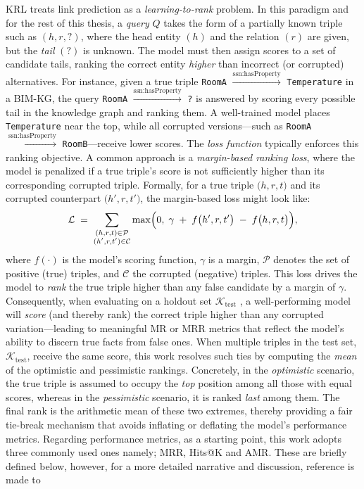 \ac{KRL} treats link prediction as a \emph{learning-to-rank} problem. In this paradigm and for the rest of this thesis, a \emph{query} \( Q \) takes the form of a partially known triple such as \((h, r, ?)\), where the head entity \((h)\) and the relation \((r)\) are given, but the \emph{tail} \((?)\) is unknown. The model must then assign scores to a set of candidate tails, ranking the correct entity \emph{higher} than incorrect (or corrupted) alternatives. For instance, given a true triple \texttt{RoomA} $\xrightarrow{\text{ssn:hasProperty}}$ \texttt{Temperature} in a \ac{BIM-KG}, the query \texttt{RoomA} $\xrightarrow{\text{ssn:hasProperty}}$ \texttt{?} is answered by scoring every possible tail in the knowledge graph and ranking them. A well-trained model places \texttt{Temperature} near the top, while all corrupted versions---such as \texttt{RoomA} $\xrightarrow{\text{ssn:hasProperty}}$ \texttt{RoomB}---receive lower scores. The \emph{loss function} typically enforces this ranking objective. A common approach is a \emph{margin-based ranking loss}, where the model is penalized if a true triple's score is not sufficiently higher than its corresponding corrupted triple. Formally, for a true triple \(\bigl(h, r, t\bigr)\) and its corrupted counterpart \(\bigl(h', r, t'\bigr)\), the margin-based loss might look like:
\[
\mathcal{L} \;=\; \sum_{\substack{(h,r,t) \in \mathcal{P} \\ (h',r,t') \in \mathcal{C}}} \max\Bigl(0,\;\gamma \;+\; f\bigl(h',r,t'\bigr) \;-\; f\bigl(h,r,t\bigr)\Bigr),
\]
where \(f(\cdot)\) is the model's scoring function, \(\gamma\) is a margin, \(\mathcal{P}\) denotes the set of positive (true) triples, and \(\mathcal{C}\) the corrupted (negative) triples. This loss drives the model to \emph{rank} the true triple higher than any false candidate by a margin of \(\gamma\). Consequently, when evaluating on a holdout set \(\mathcal{K}_{\text{test}}\) , a well-performing model will \emph{score} (and thereby rank) the correct triple higher than any corrupted variation---leading to meaningful \acf{MR} or \acf{MRR} metrics that reflect the model's ability to discern true facts from false ones. When multiple triples in the test set, $\mathcal{K}_{\text{test}}$, receive the same score, this work resolves such ties by computing the \emph{mean} of the optimistic and pessimistic rankings. Concretely, in the \emph{optimistic} scenario, the true triple is assumed to occupy the \emph{top} position among all those with equal scores, whereas in the \emph{pessimistic} scenario, it is ranked \emph{last} among them. The final rank is the arithmetic mean of these two extremes, thereby providing a fair tie-break mechanism that avoids inflating or deflating the model’s performance metrics. Regarding performance metrics, as a starting point, this work adopts three commonly used ones namely; \acf{MRR}, Hits@K and \acf{AMR}. These are briefly defined below, however, for a more detailed narrative and discussion, reference is made to \citep{Ali2020BringingFramework}

